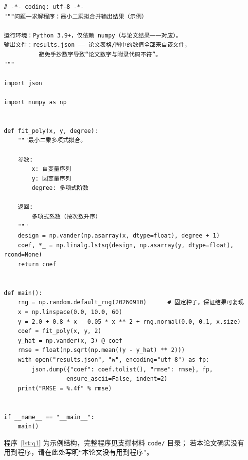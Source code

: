 \documentclass[12pt,a4paper,fontset=windows]{ctexart}
\begin{document}
\begin{lstlisting}[caption={问题一求解程序（示例，请替换为你的完整代码）}, label={lst:q1}]
# -*- coding: utf-8 -*-
"""问题一求解程序：最小二乘拟合并输出结果（示例）

运行环境：Python 3.9+，仅依赖 numpy（与论文结果一一对应）。
输出文件：results.json —— 论文表格/图中的数值全部来自该文件，
          避免手抄数字导致“论文数字与附录代码不符”。
"""

import json

import numpy as np


def fit_poly(x, y, degree):
    """最小二乘多项式拟合。

    参数:
        x: 自变量序列
        y: 因变量序列
        degree: 多项式阶数

    返回:
        多项式系数（按次数升序）
    """
    design = np.vander(np.asarray(x, dtype=float), degree + 1)
    coef, *_ = np.linalg.lstsq(design, np.asarray(y, dtype=float), rcond=None)
    return coef


def main():
    rng = np.random.default_rng(20260910)      # 固定种子，保证结果可复现
    x = np.linspace(0.0, 10.0, 60)
    y = 2.0 + 0.8 * x - 0.05 * x ** 2 + rng.normal(0.0, 0.1, x.size)
    coef = fit_poly(x, y, 2)
    y_hat = np.vander(x, 3) @ coef
    rmse = float(np.sqrt(np.mean((y - y_hat) ** 2)))
    with open("results.json", "w", encoding="utf-8") as fp:
        json.dump({"coef": coef.tolist(), "rmse": rmse}, fp,
                  ensure_ascii=False, indent=2)
    print("RMSE = %.4f" % rmse)


if __name__ == "__main__":
    main()
\end{lstlisting}

程序~\ref{lst:q1} 为示例结构，完整程序见支撑材料 \texttt{code/} 目录；
若本论文确实没有用到程序，请在此处写明“本论文没有用到程序”。
\end{document}
